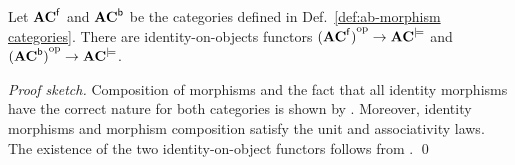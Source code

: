 \begin{theorem}
Let $\mathbf{AC}^{{\mathsf{f}}}$  and  $\mathbf{AC}^{{\mathsf{b}}}$ be the categories defined in Def.~\ref{def:ab-morphism categories}. There are identity-on-objects functors ${(\mathbf{AC}^{{\mathsf{f}}})}^{\mathrm{op}} \rightarrow \mathbf{AC}^{\models}$ and ${(\mathbf{AC}^{{\mathsf{b}}})}^{\mathrm{op}} \rightarrow \mathbf{AC}^{\models}$.
\end{theorem} 
%
\emph{Proof sketch.}  Composition of morphisms and the fact that all identity morphisms have the correct nature for both categories is shown by .
Moreover, identity morphisms and morphism composition satisfy the unit and associativity laws. The existence of the two identity-on-object functors follows from .
\qed 

